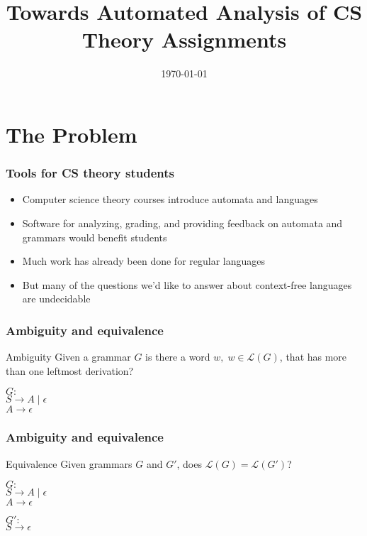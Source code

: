 \documentclass{beamer}
\title[Analysis of CS Theory Assignments]{Towards Automated Analysis of CS Theory Assignments}
\institute[RIT]{Rochester Institute of Technologoy}
\date{\today}
\begin{document}
\maketitle

\section{The Problem}

\begin{frame}
\frametitle{Tools for CS theory students}

\begin{itemize}
\item Computer science theory courses introduce automata and languages
\vspace{0.1in}
\item Software for analyzing, grading, and providing feedback on automata and grammars would benefit students
\vspace{0.1in}
\item Much work has already been done for regular languages   
\vspace{0.1in}
\item But many of the questions we'd like to answer about context-free languages are undecidable
\end{itemize}
\end{frame}

\begin{frame}
\frametitle{Ambiguity and equivalence}
\begin{block}{Ambiguity}
Given a grammar $G$ is there a word $w , \; w \in \mathcal{L}(G)$, that has more than one leftmost derivation?
\end{block}

\pause 
\vspace{0.2in}
$G:$\\
\hspace*{10pt} $S \rightarrow  A \; | \; \epsilon$\\
\hspace*{10pt} $A \rightarrow   \epsilon$
\end{frame}

\begin{frame}
\frametitle{Ambiguity and equivalence}
\begin{block}{Equivalence}
Given grammars $G$ and $G'$, does $\mathcal{L}(G) = \mathcal{L}(G')$? 
\end{block}

\pause 
\vspace{0.2in}
$G:$\\
\hspace*{10pt} $S \rightarrow  A \; | \; \epsilon$\\
\hspace*{10pt} $A \rightarrow   \epsilon$

\vspace{0.2in}
$G':$\\
\hspace*{10pt} $S \rightarrow \epsilon$
\end{frame}
\end{document}
